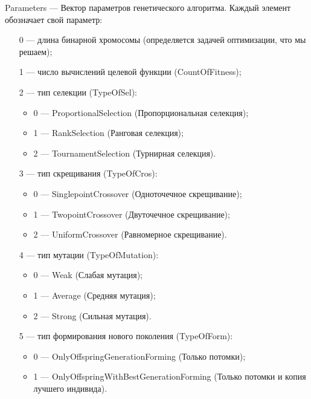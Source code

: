\documentclass[a4paper,12pt]{article}
\begin{document}
Parameters --- Вектор параметров генетического алгоритма. Каждый элемент обозначает свой параметр:
 
 \begin{itemize}
 \item [0] --- длина бинарной хромосомы (определяется задачей оптимизации, что мы решаем);
 
 \item [1] --- число вычислений целевой функции (CountOfFitness);
 
 \item [2] --- тип селекции (TypeOfSel):
 
 \begin{itemize}
       \item 0 --- ProportionalSelection (Пропорциональная селекция);
 
       \item 1 --- RankSelection (Ранговая селекция);
 
       \item 2 --- TournamentSelection (Турнирная селекция).
	    \end{itemize}
 
 \item [3] --- тип скрещивания (TypeOfCros):
  \begin{itemize}
       \item 0 --- SinglepointCrossover (Одноточечное скрещивание);
 
       \item 1 --- TwopointCrossover (Двуточечное скрещивание);
 
       \item 2 --- UniformCrossover (Равномерное скрещивание).
	    \end{itemize}
 
 \item [4] --- тип мутации (TypeOfMutation):
  \begin{itemize}
       \item 0 --- Weak (Слабая мутация);
 
       \item 1 --- Average (Средняя мутация);
 
       \item 2 --- Strong (Сильная мутация).
	    \end{itemize}
 
 \item [5] --- тип формирования нового поколения (TypeOfForm):
  \begin{itemize}
       \item 0 --- OnlyOffspringGenerationForming (Только потомки);
 
       \item 1 --- OnlyOffspringWithBestGenerationForming (Только потомки и копия лучшего индивида).
	    \end{itemize}
 \end{itemize}
 
\end{document}
